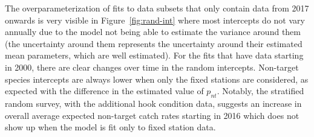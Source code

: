 \documentclass[12pt]{article}\usepackage[]{graphicx}\usepackage[]{color}
\begin{document}
The overparameterization of fits to data subsets that only contain data from 2017 onwards is very visible in Figure~\ref{fig:rand-int} where most intercepts do not vary annually due to the model not being able to estimate the variance around them (the uncertainty around them represents the uncertainty around their estimated mean parameters, which are well estimated). For the fits that have data starting in 2000, there are clear changes over time in the random intercepts. Non-target species intercepts are always lower when only the fixed stations are considered, as expected with the difference in the estimated value of \(p_{nt}\). Notably, the stratified random survey, with the additional hook condition data, suggests an increase in overall average expected non-target catch rates starting in 2016 which does not show up when the model is fit only to fixed station data.
\end{document}
